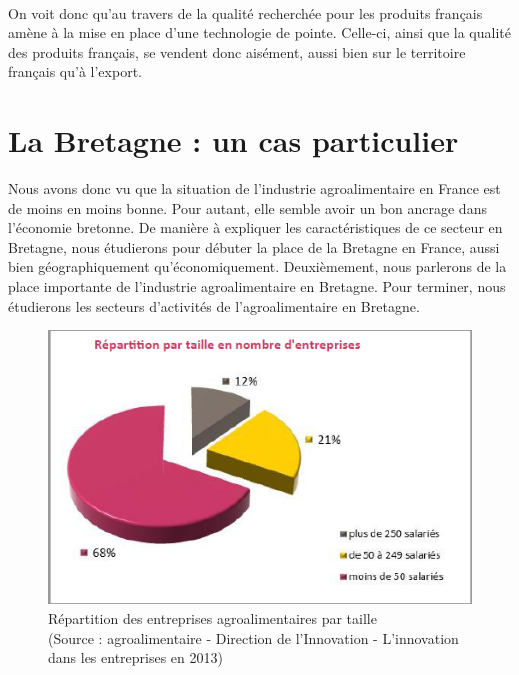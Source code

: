 \documentclass[a4paper,12pt]{report}
\begin{document}
			\paragraph{}On voit donc qu'au travers de la qualité recherchée pour les produits français amène à la mise en place d'une technologie de pointe. Celle-ci, ainsi que la qualité des produits français, se vendent donc aisément, aussi bien sur le territoire français qu'à l'export.

	\section{La Bretagne : un cas particulier}
	Nous avons donc vu que la situation de l’industrie agroalimentaire en France est de moins en moins bonne. Pour autant, elle semble avoir un bon ancrage dans l’économie bretonne. De manière à expliquer les caractéristiques de ce secteur en Bretagne, nous étudierons pour débuter la place de la Bretagne en France, aussi bien géographiquement qu’économiquement. Deuxièmement, nous parlerons de la place importante de l’industrie agroalimentaire en Bretagne. Pour terminer, nous étudierons les secteurs d’activités de l’agroalimentaire en Bretagne.
	
	
	\begin{figure}[!h]
	\centering
	\includegraphics[scale=1]{Illustrations/RepartitionTaille.png}
	\caption{Répartition des entreprises agroalimentaires par taille\\(Source : agroalimentaire - Direction de l’Innovation - L’innovation dans les entreprises en 2013\cite{InnovationEntreprises2013})}
	\label{RepartitionParTaille}
	\end{figure}
	
\end{document}
